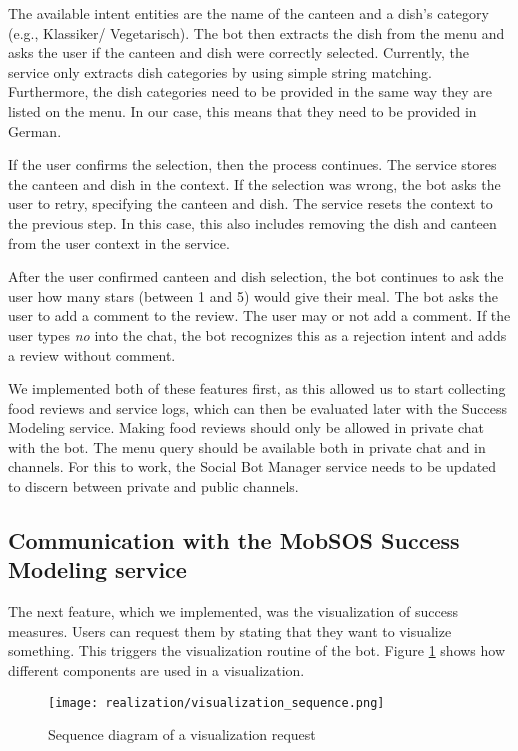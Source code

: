 The available intent entities are the name of the canteen and a dish's category (e.g., Klassiker/ Vegetarisch).
The bot then extracts the dish from the menu and asks the user if the canteen and dish were correctly selected. 
Currently, the service only extracts dish categories by using simple string matching. Furthermore, the dish categories need to be provided in the same way they are listed on the menu. In our case, this means that they need to be provided in German.

If the user confirms the selection, then the process continues. 
The service stores the canteen and dish in the context. 
If the selection was wrong, the bot asks the user to retry, specifying the canteen and dish. 
The service resets the context to the previous step. In this case, this also includes removing the dish and canteen from the user context in the service.

After the user confirmed canteen and dish selection, the bot continues to ask the user how many stars (between 1 and 5) would give their meal. 
The bot asks the user to add a comment to the review. The user may or not add a comment. If the user types \emph{no} into the chat, the bot recognizes this as a rejection intent and adds a review without comment.

We implemented both of these features first, as this allowed us to start collecting food reviews and service logs, which can then be evaluated later with the Success Modeling service.
Making food reviews should only be allowed in private chat with the bot. 
The menu query should be available both in private chat and in channels.
For this to work, the Social Bot Manager service needs to be updated to discern between private and public channels.

\subsection{Communication with the MobSOS Success Modeling service}
The next feature, which we implemented, was the visualization of success measures. Users can request them by stating that they want to visualize something.
This triggers the visualization routine of the bot. Figure \ref{fig:visualReqSeq} shows how different components are used in a visualization.
\begin{figure}[h]
    \centering
    \texttt{[image: realization/visualization\_sequence.png]}
    \caption{Sequence diagram of a visualization request}
    \label{fig:visualReqSeq}
\end{figure}

